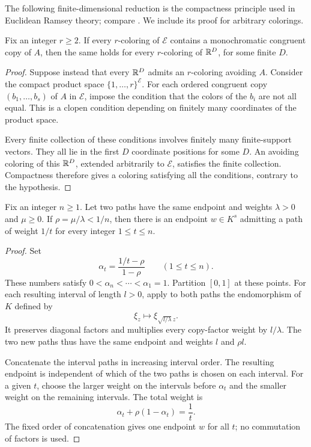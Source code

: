 The following finite-dimensional reduction is the compactness principle
used in Euclidean Ramsey theory; compare
\cite[Proposition~4]{egm-rss}. We include its proof for arbitrary colorings.

\begin{lemma}\label{paths:compactness}
Fix an integer $r\ge2$. If every $r$-coloring of $\mathcal E$ contains
a monochromatic congruent copy of $A$, then the same holds for every
$r$-coloring of $\mathbb R^D$, for some finite $D$.
\end{lemma}

\begin{proof}
Suppose instead that every $\mathbb R^D$ admits an $r$-coloring avoiding $A$.
Consider the compact product space $\{1,\ldots,r\}^{\mathcal E}$.
For each ordered congruent copy $(b_1,\ldots,b_s)$ of $A$ in
$\mathcal E$, impose the condition that the colors of the $b_i$ are
not all equal. This is a clopen condition depending on finitely many
coordinates of the product space.

Every finite collection of these conditions involves finitely many
finite-support vectors. They all lie in the first $D$ coordinate
positions for some $D$. An avoiding coloring of this $\mathbb R^D$, extended
arbitrarily to $\mathcal E$, satisfies the finite collection.
Compactness therefore gives a coloring satisfying all the conditions,
contrary to the hypothesis.
\end{proof}

\begin{lemma}\label{paths:synchronization}
Fix an integer $n\ge1$. Let two paths have the same endpoint and weights $\lambda>0$ and
$\mu\ge0$. If $\rho=\mu/\lambda<1/n$, then there is an endpoint
$w\in K^s$ admitting a path of weight $1/t$ for every integer
$1\le t\le n$.
\end{lemma}

\begin{proof}
Set
\[
\alpha_t=\frac{1/t-\rho}{1-\rho}\qquad(1\le t\le n).
\]
These numbers satisfy
$0<\alpha_n<\cdots<\alpha_1=1$. Partition $[0,1]$ at these points.
For each resulting interval of length $l>0$, apply to both paths the
endomorphism of $K$ defined by
\[
\xi_z\longmapsto\xi_{\sqrt{l/\lambda}\,z}.
\]
It preserves diagonal factors and multiplies every copy-factor weight
by $l/\lambda$. The two new paths thus have the same endpoint and
weights $l$ and $\rho l$.

Concatenate the interval paths in increasing interval order. The
resulting endpoint is independent of which of the two paths is chosen
on each interval. For a given $t$, choose the larger weight on the
intervals before $\alpha_t$ and the smaller weight on the remaining
intervals. The total weight is
\[
\alpha_t+\rho(1-\alpha_t)=\frac1t.
\]
The fixed order of concatenation gives one endpoint $w$ for all $t$;
no commutation of factors is used.
\end{proof}

